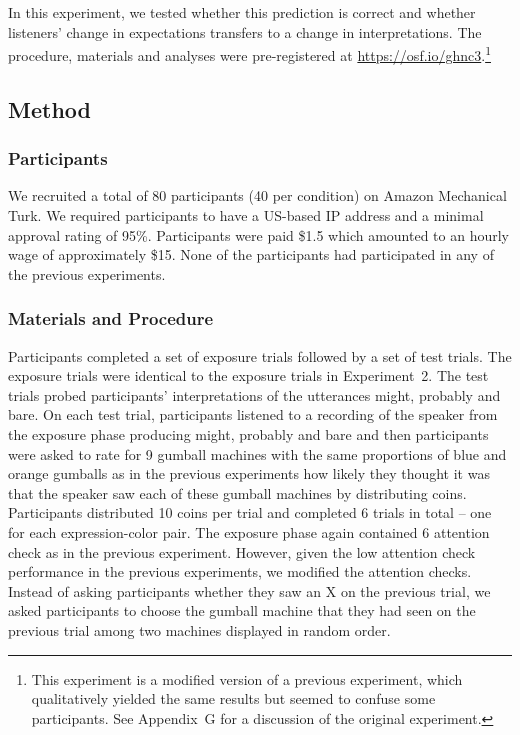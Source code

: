 \documentclass[man, floatsintext]{apa6}
\begin{document}
In this experiment, we tested whether this prediction is correct and whether listeners' change in expectations transfers to a change in interpretations. 
The procedure, materials and analyses were pre-registered at \url{https://osf.io/ghnc3}.\footnote{This experiment is a modified version of a previous experiment, which qualitatively yielded the same results but seemed to confuse some participants. See Appendix~G for a discussion of the original experiment.}

\subsection{Method}

\subsubsection{Participants}

We recruited a total of 80 participants (40 per condition) on Amazon Mechanical Turk. We required participants to have a US-based IP address and a minimal approval rating of 95\%. Participants were paid \$1.5 which amounted to an hourly wage of approximately \$15. None of the participants had participated in any of the previous experiments. 

\subsubsection{Materials and Procedure}

Participants completed a set of exposure trials followed by a set of test trials. The exposure trials were identical to the exposure trials in Experiment~2. The test trials probed participants' interpretations of the utterances {\sc might}, {\sc probably} and {\sc bare}. On each test trial, participants listened to a recording of the speaker from the exposure phase producing {\sc might}, {\sc probably} and {\sc bare} and then participants were asked to rate for 9 gumball machines with the same proportions of blue and orange gumballs as in the previous experiments how likely they thought it was that the speaker saw each of these gumball machines by distributing coins.  Participants distributed 10 coins per trial and completed 6 trials in total  -- one for each expression-color pair. The exposure phase again contained  6 attention check as in the previous experiment. However, given the low attention check performance in the previous experiments, we modified the attention checks. Instead of asking participants whether they saw an X on the previous trial, we asked participants to choose the gumball machine that they had seen on the previous trial among two machines displayed in random order.
\end{document}
